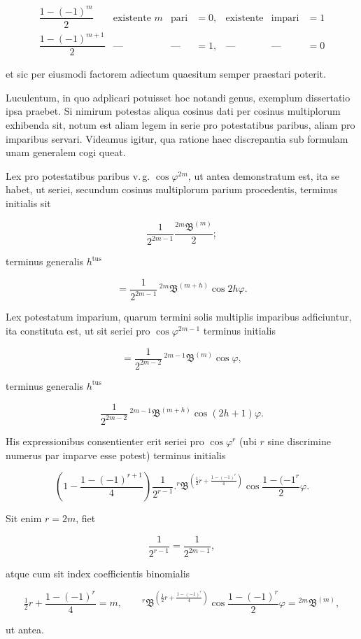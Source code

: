 \[
\begin{array}{rcccccc}
\dfrac{1-(-1)^m}{2}&\text{existente }m&\text{pari}&=0,&\text{existente}&\text{impari}&=1\\[5pt]
\dfrac{1-(-1)^{m+1}}{2}&\text{—}&\text{—}&=1,&\text{—}&\text{—}&=0
\end{array}
\]

\noindent et sic per eiusmodi factorem adiectum quaesitum semper praestari poterit.

Luculentum, in quo adplicari potuisset hoc notandi genus, exemplum dissertatio ipsa
praebet. Si nimirum potestas aliqua cosinus dati per cosinus multiplorum exhibenda
sit, notum est aliam legem in serie pro potestatibus paribus, aliam pro imparibus
servari. Videamus igitur, qua ratione haec discrepantia sub formulam unam generalem
cogi queat.

Lex pro potestatibus paribus v.\,g. $\cos\varphi^{2m}$, ut antea demonstratum est, ita se
habet, ut seriei, secundum cosinus multiplorum parium procedentis, terminus initialis
sit

\[
\frac{1}{2^{2m-1}}\frac{{}^{2m}\mathfrak{B}^{(m)}}{2};
\]

\noindent terminus generalis $h^{\text{tus}}$

\[
= \frac{1}{2^{2m-1}}\,{}^{2m}\mathfrak{B}^{(m+h)}\cos2h\varphi.
\]

Lex potestatum imparium, quarum termini solis multiplis imparibus adficiuntur, ita
constituta est, ut sit seriei pro $\cos\varphi^{2m-1}$ terminus initialis

\[
= \frac{1}{2^{2m-2}}\,{}^{2m-1}\mathfrak{B}^{(m)}\cos\varphi,
\]

\noindent terminus generalis $h^{\text{tus}}$

\[
\frac{1}{2^{2m-2}}\,{}^{2m-1}\mathfrak{B}^{(m+h)}\cos(2h+1)\varphi.
\]

His expressionibus consentienter erit seriei pro $\cos\varphi^r$ (ubi $r$ sine discrimine
numerus par imparve esse potest) terminus initialis

\[
\left(1-\frac{1-(-1)^{r+1}}{4}\right)\frac{1}{2^{r-1}} . {}^{r}\mathfrak{B}^{\left(\frac{1}{2}r+\frac{1-(-1)^r}{4}\right)}\cos\frac{1-(-1^r}{2}\varphi.
\]

\noindent Sit enim $r=2m$, fiet

\[
\frac{1}{2^{r-1}} = \frac{1}{2^{2m-1}},
\]

\noindent atque cum sit index coefficientis binomialis

\[
\tfrac{1}{2}r+\frac{1-(-1)^r}{4} = m,\qquad {}^{r}\mathfrak{B}^{\left(\frac{1}{2}r+\frac{1-(-1)^r}{4}\right)}\cos\frac{1-(-1)^r}{2}\varphi = {}^{2m}\mathfrak{B}^{(m)},
\]

\noindent ut antea.

